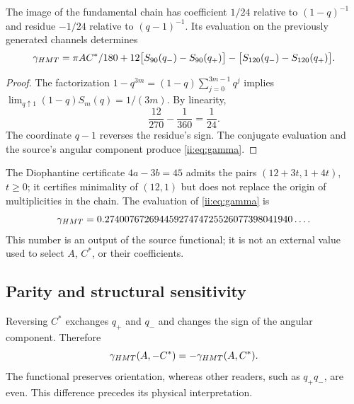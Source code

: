 \begin{theorem}
The image of the fundamental chain has coefficient $1/24$ relative to $(1-q)^{-1}$ and residue $-1/24$ relative to $(q-1)^{-1}$. Its evaluation on the previously generated channels determines
\begin{equation}
\gamma_{\HMT}=
\frac{\pi AC^*}{180}
+12\bigl[S_{90}(q_-)-S_{90}(q_+)\bigr]
-\bigl[S_{120}(q_-)-S_{120}(q_+)\bigr].
\label{ii:eq:gamma}
\end{equation}
\end{theorem}
\begin{proof}
The factorization $1-q^{3m}=(1-q)\sum_{j=0}^{3m-1}q^j$ implies
$\lim_{q\uparrow1}(1-q)S_m(q)=1/(3m)$. By linearity,
\[
\frac{12}{270}-\frac1{360}=\frac1{24}.
\]
The coordinate $q-1$ reverses the residue's sign. The conjugate evaluation and the source's angular component produce \eqref{ii:eq:gamma}.
\end{proof}

The Diophantine certificate $4a-3b=45$ admits the pairs $(12+3t,1+4t)$, $t\ge0$; it certifies minimality of $(12,1)$ but does not replace the origin of multiplicities in the chain. The evaluation of \eqref{ii:eq:gamma} is
\[
\gamma_{HMT}
=0.27400767269445927474725526077398041940\ldots.
\]
This number is an output of the source functional; it is not an external value
used to select $A$, $C^*$, or their coefficients.

\subsection{Parity and structural sensitivity}
Reversing $C^*$ exchanges $q_+$ and $q_-$ and changes the sign of the angular component. Therefore
\[
\gamma_{HMT}(A,-C^*)=-\gamma_{HMT}(A,C^*).
\]
The functional preserves orientation, whereas other readers, such as $q_+q_-$, are even. This difference precedes its physical interpretation.
